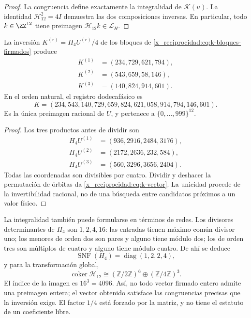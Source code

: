 \begin{proof}
La congruencia define exactamente la integralidad de \(\mathscr K(u)\).
La identidad \(\mathcal H_{12}^2=4I\) demuestra las dos composiciones
inversas. En particular, todo \(k\in\ZZ^{12}\) tiene preimagen
\(\mathcal H_{12}k\in\mathcal L_H\).
\end{proof}

\begin{proposition}
\label{x_reciprocidad:prop:k-sello}
La inversión \(K^{(r)}=H_4U^{(r)}/4\) de los bloques de
\eqref{x_reciprocidad:eq:k-bloques-firmados} produce
\begin{align*}
 K^{(1)}&=(234,729,621,794),\\
 K^{(2)}&=(543,659,58,146),\\
 K^{(3)}&=(140,824,914,601).
\end{align*}
En el orden natural, el registro dodecafásico es
\begin{equation}
 K=(234,543,140,729,659,824,621,058,914,794,146,601).
 \label{x_reciprocidad:eq:k-vector}
\end{equation}
Es la única preimagen racional de \(U\), y pertenece a
\(\{0,\ldots,999\}^{12}\).
\end{proposition}

\begin{proof}
Los tres productos antes de dividir son
\begin{align*}
 H_4U^{(1)}&=(936,2916,2484,3176),\\
 H_4U^{(2)}&=(2172,2636,232,584),\\
 H_4U^{(3)}&=(560,3296,3656,2404).
\end{align*}
Todas las coordenadas son divisibles por cuatro. Dividir y deshacer la
permutación de órbitas da \eqref{x_reciprocidad:eq:k-vector}. La unicidad procede de la
invertibilidad racional, no de una búsqueda entre candidatos próximos a
un valor físico.
\end{proof}

La integralidad también puede formularse en términos de redes. Los
divisores determinantes de \(H_4\) son \(1,2,4,16\): las entradas
tienen máximo común divisor uno; los menores de orden dos son pares y
alguno tiene módulo dos; los de orden tres son múltiplos de cuatro y
alguno tiene módulo cuatro. De ahí se deduce
\[
 \operatorname{SNF}(H_4)=\operatorname{diag}(1,2,2,4),
\]
y para la transformación global,
\[
 \operatorname{coker}\mathcal H_{12}
 \cong(\mathbb Z/2\mathbb Z)^6\oplus(\mathbb Z/4\mathbb Z)^3.
\]
El índice de la imagen es \(16^3=4096\). Así, no todo vector firmado
entero admite una preimagen entera; el vector obtenido satisface las
congruencias precisas que la inversión exige. El factor \(1/4\) está
forzado por la matriz, y no tiene el estatuto de un coeficiente libre.

